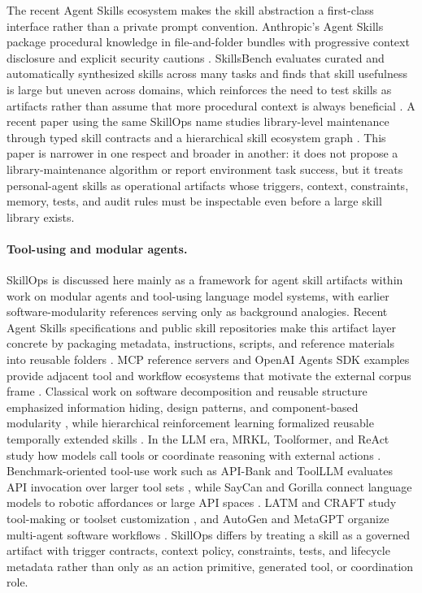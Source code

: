 \documentclass[11pt]{article}
\begin{document}
The recent Agent Skills ecosystem makes the skill abstraction a first-class
interface rather than a private prompt convention. Anthropic's Agent Skills
package procedural knowledge in file-and-folder bundles with progressive
context disclosure and explicit security cautions
\citep{anthropic2025agentskills}. SkillsBench evaluates curated and
automatically synthesized skills across many tasks and finds that skill usefulness is
large but uneven across domains, which reinforces the need to test skills as
artifacts rather than assume that more procedural context is always beneficial
\citep{li2026skillsbench}. A recent paper using the same SkillOps name studies
library-level maintenance through typed skill contracts and a hierarchical skill
ecosystem graph \citep{pu2026skillops}. This paper is narrower in one respect
and broader in another: it does not propose a library-maintenance algorithm or
report environment task success, but it treats personal-agent skills as
operational artifacts whose triggers, context, constraints, memory, tests, and
audit rules must be inspectable even before a large skill library exists.

\paragraph{Tool-using and modular agents.}

SkillOps is discussed here mainly as a framework for agent skill artifacts
within work on modular agents and tool-using language model systems, with
earlier software-modularity references serving only as background analogies.
Recent Agent Skills specifications and public skill repositories make this
artifact layer concrete by packaging metadata, instructions, scripts, and
reference materials into reusable folders
\citep{agentskills2026spec,anthropic2026skills}. MCP reference servers and
OpenAI Agents SDK examples provide adjacent tool and workflow ecosystems that
motivate the external corpus frame
\citep{modelcontextprotocol2026servers,openai2026agentspython,openai2026agentsjs}.
Classical work on software decomposition and reusable structure emphasized
information hiding, design patterns, and component-based modularity
\citep{parnas1972criteria,gamma1994design,szyperski2002component}, while
hierarchical reinforcement learning formalized reusable temporally extended
skills \citep{sutton1999options,dietterich2000maxq}. In the LLM era, MRKL,
Toolformer, and ReAct study how models call tools or coordinate reasoning with
external actions \citep{karpas2022mrkl,schick2023toolformer,yao2023react}.
Benchmark-oriented tool-use work such as API-Bank and ToolLLM evaluates API
invocation over larger tool sets \citep{li2023apibank,qin2024toolllm}, while
SayCan and Gorilla connect language models to robotic affordances or large API
spaces \citep{ichter2023saycan,patil2024gorilla}. LATM and CRAFT study
tool-making or toolset customization \citep{cai2024latm,yuan2024craft}, and
AutoGen and MetaGPT organize multi-agent software workflows
\citep{wu2024autogen,hong2024metagpt}. SkillOps differs by treating a skill as
a governed artifact with trigger contracts, context policy, constraints, tests,
and lifecycle metadata rather than only as an action primitive, generated tool,
or coordination role.
\end{document}
